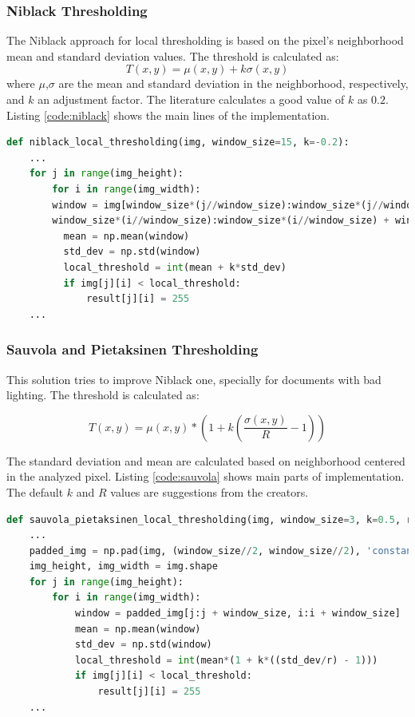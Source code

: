 \documentclass[]{IEEEtran}
\begin{document}
\subsubsection{Niblack Thresholding}
The Niblack approach for local thresholding is based on the pixel's neighborhood mean and standard deviation values. The threshold is calculated as:
\begin{equation}
  T(x, y) = \mu(x, y) + k\sigma(x,y) 
\end{equation}
where $\mu$,$\sigma$ are the mean and standard deviation in the neighborhood, respectively, and $k$ an adjustment factor. The literature calculates a good value of $k$ as $0.2$. Listing \ref{code:niblack} shows the main lines of the implementation.

\begin{lstlisting}[language=Python, caption={Niblack Local Thresholding Implementation}, label={code:niblack}]
  def niblack_local_thresholding(img, window_size=15, k=-0.2):
    ...
    for j in range(img_height):
        for i in range(img_width):
        window = img[window_size*(j//window_size):window_size*(j//window_size) + window_size,
        window_size*(i//window_size):window_size*(i//window_size) + window_size]
          mean = np.mean(window)
          std_dev = np.std(window)
          local_threshold = int(mean + k*std_dev)
          if img[j][i] < local_threshold:
              result[j][i] = 255
    ...
\end{lstlisting}

\subsubsection{Sauvola and Pietaksinen Thresholding}
This solution tries to improve Niblack one, specially for documents with bad lighting. The threshold is calculated as:

\begin{equation}
  T(x,y) = \mu (x,y)*(1 + k(\dfrac{\sigma(x,y)}{R} - 1))
\end{equation}

The standard deviation and mean are calculated based on neighborhood centered in the analyzed pixel. Listing \ref{code:sauvola} shows main parts of implementation. The default $k$ and $R$ values are suggestions from the creators.

\begin{lstlisting}[language=Python, caption={Sauvola and Pietaksinen Local Thresholding Implementation}, label={code:sauvola}]
  def sauvola_pietaksinen_local_thresholding(img, window_size=3, k=0.5, r=128):
    ...
    padded_img = np.pad(img, (window_size//2, window_size//2), 'constant')
    img_height, img_width = img.shape
    for j in range(img_height):
        for i in range(img_width):
            window = padded_img[j:j + window_size, i:i + window_size]
            mean = np.mean(window)
            std_dev = np.std(window)
            local_threshold = int(mean*(1 + k*((std_dev/r) - 1)))
            if img[j][i] < local_threshold:
                result[j][i] = 255
    ...
\end{lstlisting}
\end{document}
